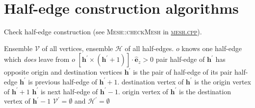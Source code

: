 \documentclass[aps, superscriptaddress, notitlepage, longbibliography]{revtex4-1}
\begin{document}
% 

\appendix

\newpage
\section{Half-edge construction algorithms}

\begin{algorithm}[H]
\caption{Check half-edge construction (see \textsc{Mesh::checkMesh} in \href{../mesh.cpp}{\textsc{mesh.cpp}}).}
\label{alg:check}
\begin{algorithmic}[1]
\REQUIRE Ensemble $\mathcal{V}$ of all vertices, ensemble $\mathcal{H}$ of all half-edges.
     
    \ENDIF
     
     
         
            \ASSERT $o$ knows one half-edge which \textit{does} leave from $o$
        \ENDIF
        \ASSERT $[\boldsymbol{h}^{\prime} \times (\boldsymbol{h}^{\prime} + 1)] \cdot \hat{\boldsymbol{e}}_z > 0$  \label{alg:checkori}
        \ASSERT pair half-edge of $\boldsymbol{h}^{\prime}$ has opposite origin and destination vertices 
        \ASSERT $\boldsymbol{h}^{\prime}$ is the pair of half-edge of its pair half-edge
        \ASSERT $\boldsymbol{h}^{\prime}$ is previous half-edge of $\boldsymbol{h}^{\prime} + 1$. 
        \ASSERT destination vertex of $\boldsymbol{h}^{\prime}$ is the origin vertex of $\boldsymbol{h}^{\prime} + 1$
        \ASSERT $\boldsymbol{h}^{\prime}$ is next half-edge of $\boldsymbol{h}^{\prime} - 1$. 
        \ASSERT origin vertex of $\boldsymbol{h}^{\prime}$ is the destination vertex of $\boldsymbol{h}^{\prime} - 1$
    \ENDFOR
\ENDFOR
\ASSERT $\mathcal{V}^{\prime} = \emptyset$ and $\mathcal{H}^{\prime} = \emptyset$
\end{algorithmic}
\end{algorithm}
\end{document}
